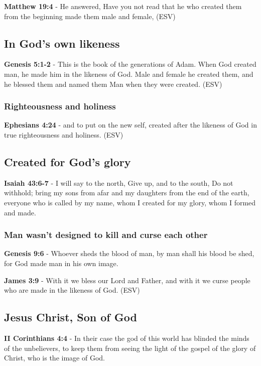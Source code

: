 \documentclass[11pt]{article}
\begin{document}
\textbf{Matthew 19:4} - He answered, Have you not read that he who created them from the beginning made them male and female, (ESV)

\subsection{In God's own likeness}
\label{sec:orgc35d3b8}
\textbf{Genesis 5:1-2} -  This is the book of the generations of Adam.  When God created man, he made him in the likeness of God.  Male and female he created them, and he blessed them and named them Man when they were created.  (ESV)

\subsubsection{Righteousness and holiness}
\label{sec:orgaced6f6}
\textbf{Ephesians 4:24} - and to put on the new self, created after the likeness of God in true righteousness and holiness. (ESV)

\subsection{Created for God's glory}
\label{sec:org263c93c}
\textbf{Isaiah 43:6-7} - I will say to the north, Give up, and to the south, Do not withhold; bring my sons from afar and my daughters from the end of the earth, everyone who is called by my name, whom I created for my glory, whom I formed and made.

\subsubsection{Man wasn't designed to kill and curse each other}
\label{sec:org41cd3e3}
\textbf{Genesis 9:6} - Whoever sheds the blood of man, by man shall his blood be shed, for God made man in his own image.

\textbf{James 3:9} - With it we bless our Lord and Father, and with it we curse people who are made in the likeness of God. (ESV)

\subsection{Jesus Christ, Son of God}
\label{sec:org36e62be}
\textbf{II Corinthians 4:4} - In their case the god of this world has blinded the minds of the unbelievers, to keep them from seeing the light of the gospel of the glory of Christ, who is the image of God.
\end{document}
